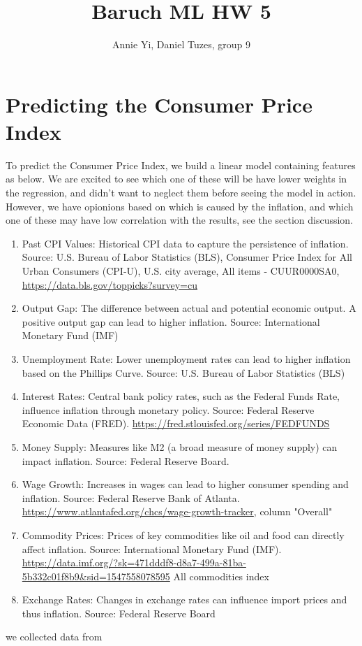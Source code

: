 \documentclass{article}
\title{Baruch ML HW 5}
\author{Annie Yi, Daniel Tuzes, group 9}
\begin{document}
\maketitle
\section*{Predicting the Consumer Price Index}
To predict the Consumer Price Index, we build a linear model containing features as below.
We are excited to see which one of these will be have lower weights in the regression,
and didn't want to neglect them before seeing the model in action.
However, we have opionions based on which is caused by the inflation,
and which one of these may have low correlation with the results,
see the section discussion.
\begin{enumerate}
    \item Past CPI Values: Historical CPI data to capture the persistence of inflation.
          Source: U.S. Bureau of Labor Statistics (BLS),
          Consumer Price Index for All Urban Consumers (CPI-U), U.S. city average, All items - CUUR0000SA0,
          \url{https://data.bls.gov/toppicks?survey=cu}
    \item Output Gap: The difference between actual and potential economic output. A positive output gap can
          lead to higher inflation. Source: International Monetary Fund (IMF)
    \item Unemployment Rate: Lower unemployment rates can lead to higher inflation based on the Phillips
          Curve. Source: U.S. Bureau of Labor Statistics (BLS)
    \item Interest Rates: Central bank policy rates, such as the Federal Funds Rate, influence inflation through
          monetary policy. Source: Federal Reserve Economic Data (FRED). \url{https://fred.stlouisfed.org/series/FEDFUNDS}
    \item Money Supply: Measures like M2 (a broad measure of money supply) can impact inflation. Source:
          Federal Reserve Board.
    \item Wage Growth: Increases in wages can lead to higher consumer spending and inflation.
          Source: Federal Reserve Bank of Atlanta.
          \url{https://www.atlantafed.org/chcs/wage-growth-tracker}, column "Overall"
    \item Commodity Prices: Prices of key commodities like oil and food can directly affect inflation.
          Source:
          International Monetary Fund (IMF). \url{https://data.imf.org/?sk=471dddf8-d8a7-499a-81ba-5b332c01f8b9&sid=1547558078595}
          All commodities index
    \item Exchange Rates: Changes in exchange rates can influence import prices and thus inflation. Source:
          Federal Reserve Board
\end{enumerate}
we collected data from
\end{document}

